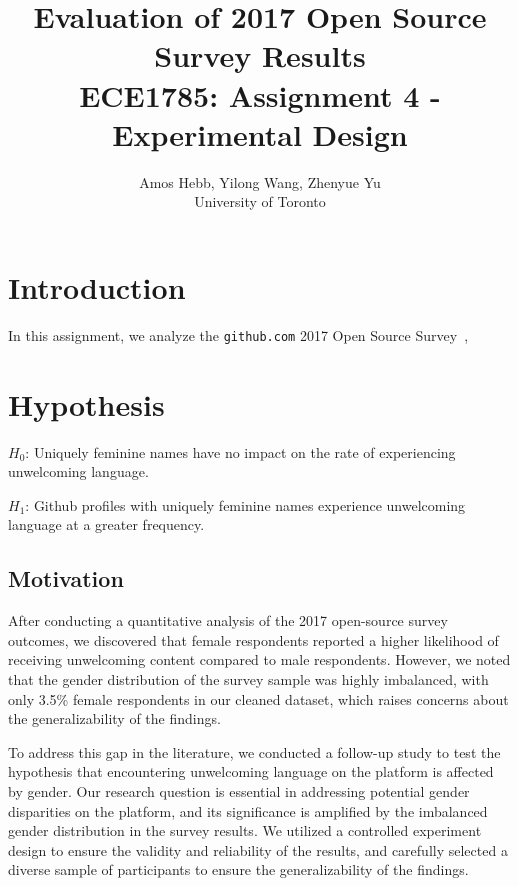 \documentclass[journal,12pt,onecolumn,]{IEEEtran}
\begin{document}
\title{Evaluation of 2017 Open Source Survey Results \\
{\normalsize ECE1785: Assignment 4 - Experimental Design}}

\author{Amos Hebb, Yilong Wang, Zhenyue Yu\\ \small University of Toronto}

\maketitle

\section{Introduction}

In this assignment, we analyze the \texttt{github.com} 2017 Open Source Survey~\cite{gitHubOpenSourceSurvey2017},

\section{Hypothesis}

$H_0$: Uniquely feminine names have no impact on the rate of experiencing unwelcoming language.

$H_1$: Github profiles with uniquely feminine names experience unwelcoming language at a greater frequency.

\subsection{Motivation}

After conducting a quantitative analysis of the 2017 open-source survey outcomes, we discovered that female respondents reported a higher likelihood of receiving unwelcoming content compared to male respondents. However, we noted that the gender distribution of the survey sample was highly imbalanced, with only 3.5\% female respondents in our cleaned dataset, which raises concerns about the generalizability of the findings.

To address this gap in the literature, we conducted a follow-up study to test the hypothesis that encountering unwelcoming language on the platform is affected by gender. Our research question is essential in addressing potential gender disparities on the platform, and its significance is amplified by the imbalanced gender distribution in the survey results. We utilized a controlled experiment design to ensure the validity and reliability of the results, and carefully selected a diverse sample of participants to ensure the generalizability of the findings.
\end{document}
